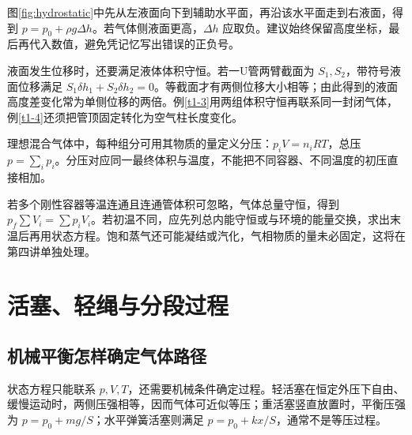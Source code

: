 图\ref{fig:hydrostatic}中先从左液面向下到辅助水平面，再沿该水平面走到右液面，得到 $p=p_0+\rho g\Delta h$。若气体侧液面更高，$\Delta h$ 应取负。建议始终保留高度坐标，最后再代入数值，避免凭记忆写出错误的正负号。

液面发生位移时，还要满足液体体积守恒。若一U管两臂截面为 $S_1,S_2$，带符号液面位移满足 $S_1\delta h_1+S_2\delta h_2=0$。等截面才有两侧位移大小相等；由此得到的液面高度差变化常为单侧位移的两倍。例\ref{t1-3}用两组体积守恒再联系同一封闭气体，例\ref{t1-4}还须把管顶固定转化为空气柱长度变化。


理想混合气体中，每种组分可用其物质的量定义分压：$p_iV=n_iRT$，总压 $p=\sum_i p_i$。分压对应同一最终体积与温度，不能把不同容器、不同温度的初压直接相加。

若多个刚性容器等温连通且连通管体积可忽略，气体总量守恒，得到 $p_f\sum V_i=\sum p_iV_i$。若初温不同，应先列总内能守恒或与环境的能量交换，求出末温后再用状态方程。饱和蒸气还可能凝结或汽化，气相物质的量未必固定，这将在第四讲单独处理。

\section{活塞、轻绳与分段过程}
\subsection{机械平衡怎样确定气体路径}
状态方程只能联系 $p,V,T$，还需要机械条件确定过程。轻活塞在恒定外压下自由、缓慢运动时，两侧压强相等，因而气体可近似等压；重活塞竖直放置时，平衡压强为 $p=p_0+mg/S$；水平弹簧活塞则满足 $p=p_0+kx/S$，通常不是等压过程。


